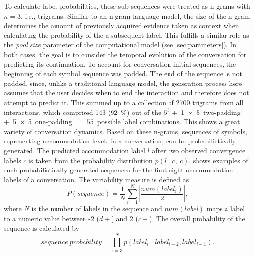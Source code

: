 To calculate label probabilities, these sub-sequences were treated as n-grams with $n = 3$, i.e., trigrams.
Similar to an n-gram language model, the size of the n-gram determines the amount of previously acquired evidence taken as context when calculating the probability of the a subsequent label.
This fulfills a similar role as the \emph{pool size} parameter of the computational model (see \cref{sec:parameters}).
In both cases, the goal is to consider the temporal evolution of the conversation for predicting its continuation.
To account for conversation-initial sequences, the beginning of each symbol sequence was padded.
The end of the sequence is not padded, since, unlike a traditional language model, the generation process here assumes that the user decides when to end the interaction and therefore does not attempt to predict it.
This summed up to a collection of \num{2700} trigrams from all interactions, which comprised 143 (\SI{92}{\percent}) out of the $5^3$ +~1~$\times$~5~two-padding +~5~$\times$~5~one-padding $= 155$~possible label combinations.
This shows a great variety of conversation dynamics.
Based on these n-grams, sequences of symbols, representing accommodation levels in a conversation, can be probabilistically generated.
The predicted accommodation label $l$ after two observed convergence labels $c$ is taken from the probability distribution $p(l \mid c,\ c)$.
 shows examples of such probabilistically generated sequences for the first eight accommodation labels of a conversation.
The variability measure is defined as
%
\begin{equation}
	P(sequence) = \frac{1}{N} \sum_{i=1}^{N} \left| \frac{num(label_i)}{2} \right|,
\end{equation}
\noindent
%
where $N$ is the number of labels in the sequence and $num(label)$ maps a label to a numeric value between -2 ($d+$) and 2 ($c+$).
The overall probability of the sequence is calculated by
%
\begin{equation}
	sequence\ probability = \prod_{i=3}^{N} p(label_i \mid label_{i-2}, label_{i-1}).
\end{equation}
